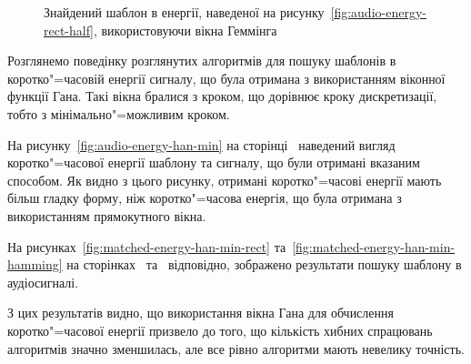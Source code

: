 \begin{figure}[h]

            \caption{Знайдений шаблон в енергії, наведеної на рисунку~\ref{fig:audio-energy-rect-half}, використовуючи
                вікна Геммінга}
            \label{fig:matched-energy-rect-half-hamming}
        \end{figure}

        \clearpage

        Розглянемо поведінку розглянутих алгоритмів для пошуку шаблонів в коротко"=часовій енергії сигналу, що була
        отримана з використанням віконної функції Гана.
        Такі вікна бралися з кроком, що дорівнює кроку дискретизації, тобто з мінімально"=можливим кроком.

        На рисунку~\ref{fig:audio-energy-han-min} на сторінці~\pageref{fig:audio-energy-han-min} наведений
        вигляд коротко"=часової енергії шаблону та сигналу, що були отримані вказаним способом.
        Як видно з цього рисунку, отримані коротко"=часові енергії мають більш гладку форму, ніж коротко"=часова
        енергія, що була отримана з використанням прямокутного вікна.

        На рисунках~\ref{fig:matched-energy-han-min-rect} та~\ref{fig:matched-energy-han-min-hamming} на
        сторінках~\pageref{fig:matched-energy-han-min-rect} та~\pageref{fig:matched-energy-han-min-hamming}
        відповідно, зображено результати пошуку шаблону в аудіосигналі.

        З цих результатів видно, що використання вікна Гана для обчислення коротко"=часової енергії призвело до того,
        що кількість хибних спрацювань алгоритмів значно зменшилась, але все рівно алгоритми мають невелику точність.

